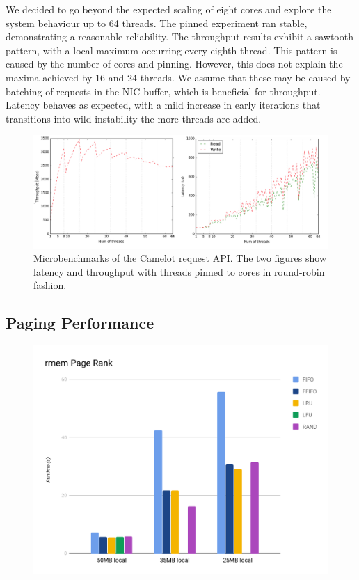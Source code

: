 We decided to go beyond the expected scaling of eight cores and explore the system behaviour up to 64 threads. The pinned experiment ran stable, demonstrating a reasonable reliability. The throughput results exhibit a sawtooth pattern, with a local maximum occurring  every eighth thread. This pattern is caused by the number of cores and pinning. However, this does not explain the maxima achieved by 16 and 24 threads. We assume that these may be caused by batching of requests in the NIC buffer, which is beneficial for throughput.
Latency behaves as expected, with a mild increase in early iterations that transitions into wild instability the more threads are added.

\begin{figure}[H]
    \includegraphics[width=\textwidth]{fig/threads_pinned}
    \caption{Microbenchmarks of the Camelot request API. The two figures show latency and throughput with threads pinned to cores in round-robin fashion.}
    \label{fig:threads}
\end{figure}

\subsection{Paging Performance}

\begin{figure}[H]
    \includegraphics[width=\columnwidth]{fig/policyPerformance}
    \caption{}
    \label{fig:policyPerformance}
\end{figure}

